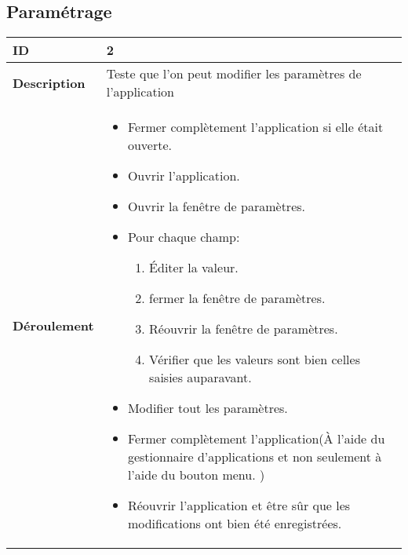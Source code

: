 	\subsection{Paramétrage}
			 \begin{longtable}{m{4cm}|p{10cm}|}
			 \textbf{ ID} & 2 \\
			 \hline \textbf{Description} & Teste que l'on peut modifier les paramètres de l'application\\
			 \hline \textbf{Déroulement} &
				 \begin{itemize}
					 \item Fermer complètement l'application si elle était ouverte.
					 \item Ouvrir l'application.
					 \item  Ouvrir la fenêtre de paramètres.
					 \item  Pour chaque champ:
						 \begin{enumerate}
						 	\item Éditer la valeur.
						 	\item fermer la fenêtre de paramètres.
						 	\item Réouvrir la fenêtre de paramètres.
						 	\item Vérifier que les valeurs sont bien celles saisies auparavant.
						 \end{enumerate}
					 \item Modifier tout les paramètres.
					 \item Fermer complètement l'application(À l'aide du gestionnaire d'applications et non seulement à l'aide du bouton menu. )
					 \item Réouvrir l'application et être sûr que les modifications ont bien été enregistrées.
				 \end{itemize}
			 \\
		 \end{longtable} 
